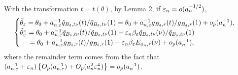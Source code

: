 \documentclass{article}
\begin{document}
	With the transformation $t=t(\theta)$, by Lemma 2, if $\varepsilon_{n}=o(a_{n}^{-1/2})$,
	\begin{eqnarray}
	\begin{cases}
	\tilde{\theta}_{\varepsilon}=\theta_{0}+a_{n,\varepsilon}^{-1}\tilde{q}_{B_{\delta},t\nu}(t)/\tilde{q}_{B_{\delta},t\nu}(1)=\theta_{0}+a_{n,\varepsilon}^{-1}g_{B_{\delta},r}(t)/g_{B_{\delta},r}(1)+o_{p}(a_{n}^{-1}),\\
	\tilde{\theta}_{\varepsilon}^{x}=\theta_{0}+a_{n,\varepsilon}^{-1}\tilde{q}_{B_{\delta},t\nu}(t)/\tilde{q}_{B_{\delta},t\nu}(1)-\varepsilon_{n}\beta_{\varepsilon}\tilde{q}_{B_{\delta},t\nu}(\nu)/\tilde{q}_{B_{\delta},t\nu}(1)\\
	\hspace{5mm} =\theta_{0}+a_{n,\varepsilon}^{-1}g_{B_{\delta},r}(t)/g_{B_{\delta},r}(1)-\varepsilon_{n}\beta_{\varepsilon}E_{a_{n},r}(\nu)+o_{p}(a_{n}^{-1}),
	\end{cases}\label{eq4}
	\end{eqnarray}
	where the remainder term comes from the fact that $(a_{n,\varepsilon}^{-1}+\varepsilon_{n})\left\{ O_{p}(a_{n,\varepsilon}^{-1})+O_{p}(a_{n}^{2}\varepsilon_{n}^{4})\right\} =o_{p}(a_{n}^{-1})$.
	
\end{document}

